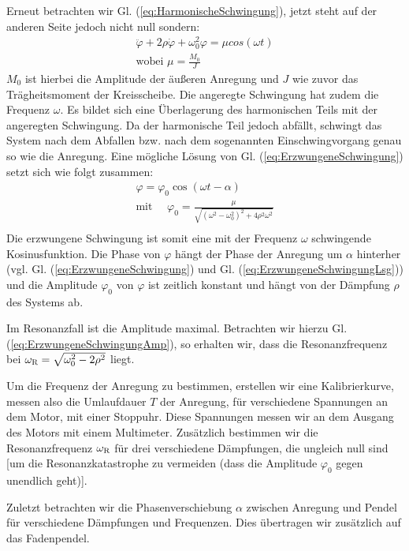 \documentclass[11pt,a4paper,titlepage, ngerman]{article}
\newcommand{\refeq}[1]{Gl. (\ref{eq:#1})}
\begin{document}
			Erneut betrachten wir \refeq{HarmonischeSchwingung}, jetzt steht auf der anderen Seite jedoch nicht null sondern:
			\begin{align}
				\ddot{\varphi}+2\rho\dot{\varphi}+\omega_0^2\varphi= \mu cos(\omega t) \label{eq:ErzwungeneSchwingung}\\
				\text{wobei } \mu = \frac{M_0}{J}
			\end{align}
			$M_0$ ist hierbei die Amplitude der äußeren Anregung und $J$ wie zuvor das Trägheitsmoment der Kreisscheibe. Die angeregte Schwingung hat zudem die Frequenz $\omega$.
			Es bildet sich eine Überlagerung des harmonischen Teils mit der angeregten Schwingung. Da der harmonische Teil jedoch abfällt, schwingt das System nach dem Abfallen bzw. nach dem sogenannten Einschwingvorgang genau so wie die Anregung.
			Eine mögliche Lösung von \refeq{ErzwungeneSchwingung} setzt sich wie folgt zusammen:
			\begin{align}
				\varphi = \varphi_0 \cos{(\omega t-\alpha)} \label{eq:ErzwungeneSchwingungLsg}\\
				\text{mit } \quad \varphi_0 = \frac{\mu}{\sqrt{(\omega^2-\omega_0^2)^2+4\rho^2\omega^2}} \label{eq:ErzwungeneSchwingungAmp}\\
			\end{align}
			Die erzwungene Schwingung ist somit eine mit der Frequenz $\omega$ schwingende Kosinusfunktion. Die Phase von $\varphi$ hängt der Phase der Anregung um $\alpha$ hinterher (vgl. \refeq{ErzwungeneSchwingung} und \refeq{ErzwungeneSchwingungLsg}) und die Amplitude $\varphi_0$ von $\varphi$ ist zeitlich konstant und hängt von der Dämpfung $\rho$ des Systems ab.
			
			Im Resonanzfall ist die Amplitude maximal. Betrachten wir hierzu \refeq{ErzwungeneSchwingungAmp}, so erhalten wir, dass die Resonanzfrequenz bei $\omega_\textsc{R} = \sqrt{\omega_0^2-2\rho^2}$ liegt.
			
			Um die Frequenz der Anregung zu bestimmen, erstellen wir eine Kalibrierkurve, messen also die Umlaufdauer $T$ der Anregung, für verschiedene Spannungen an dem Motor, mit einer Stoppuhr. Diese Spannungen messen wir an dem Ausgang des Motors mit einem Multimeter.
			Zusätzlich bestimmen wir die Resonanzfrequenz $\omega_\textsc{R}$ für drei verschiedene Dämpfungen, die ungleich null sind [um die Resonanzkatastrophe zu vermeiden (dass die Amplitude $\varphi_0$ gegen unendlich geht)].
				
			Zuletzt betrachten wir die Phasenverschiebung $\alpha$ zwischen Anregung und Pendel für verschiedene Dämpfungen und Frequenzen. Dies übertragen wir zusätzlich auf das Fadenpendel.
		
\end{document}
